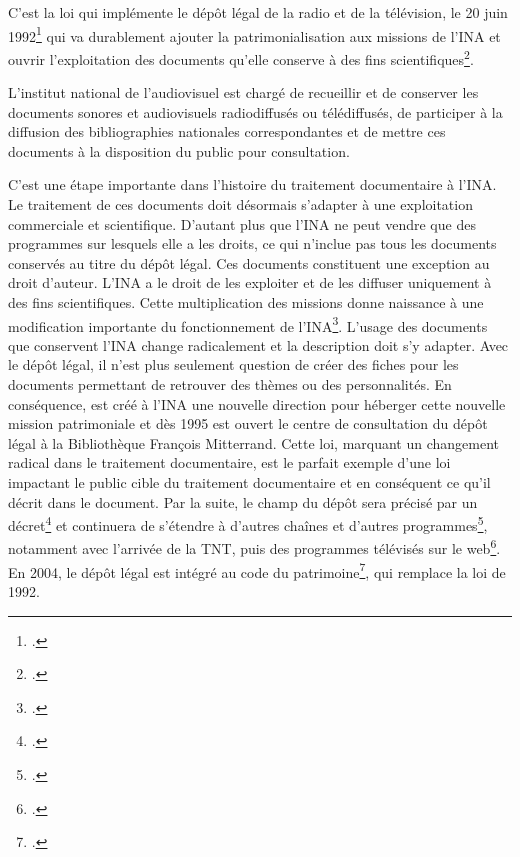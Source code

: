 C’est la loi qui implémente le dépôt légal de la radio et de la télévision, le 20 juin 1992\footcite[]{zotero-item-332} qui va durablement ajouter la patrimonialisation aux missions de l’INA et ouvrir l’exploitation des documents qu’elle conserve à des fins scientifiques\footcite[][23]{varra2023}.  
\begin{displayquote}
	L’institut national de l’audiovisuel est chargé de recueillir et de conserver les documents sonores et audiovisuels radiodiffusés ou télédiffusés, de participer à la diffusion des bibliographies nationales correspondantes et de mettre ces documents à la disposition du public pour consultation.
\end{displayquote}
C'est une étape importante dans l'histoire du traitement documentaire à l'INA. Le traitement de ces documents doit désormais s’adapter à une exploitation commerciale et scientifique. D’autant plus que l’INA ne peut vendre que des programmes sur lesquels elle a les droits, ce qui n’inclue pas tous les documents conservés au titre du dépôt légal. Ces documents constituent une exception au droit d’auteur. L’INA a le droit de les exploiter et de les diffuser uniquement à des fins scientifiques. Cette multiplication des missions donne naissance à une modification importante du fonctionnement de l’INA\footcite[][23]{varra2023}. L'usage des documents que conservent l'INA change radicalement et la description doit s'y adapter. Avec le dépôt légal, il n'est plus seulement question de créer des fiches pour les documents permettant de retrouver des thèmes ou des personnalités. En conséquence, est créé à l’INA une nouvelle direction pour héberger cette nouvelle mission patrimoniale et dès 1995 est ouvert le centre de consultation du dépôt légal à la Bibliothèque François Mitterrand. Cette loi, marquant un changement radical dans le traitement documentaire, est le parfait exemple d'une loi impactant le public cible du traitement documentaire et en conséquent ce qu'il décrit dans le document. Par la suite, le champ du dépôt sera précisé par un décret\footcite[]{zotero-item-330} et continuera de s’étendre à d’autres chaînes et d’autres programmes\footcite[][25]{varra2023}, notamment avec l’arrivée de la TNT, puis des programmes télévisés sur le web\footcite[]{zotero-item-647}. En 2004, le dépôt légal est intégré au code du patrimoine\footcite[]{2004}, qui remplace la loi de 1992.


